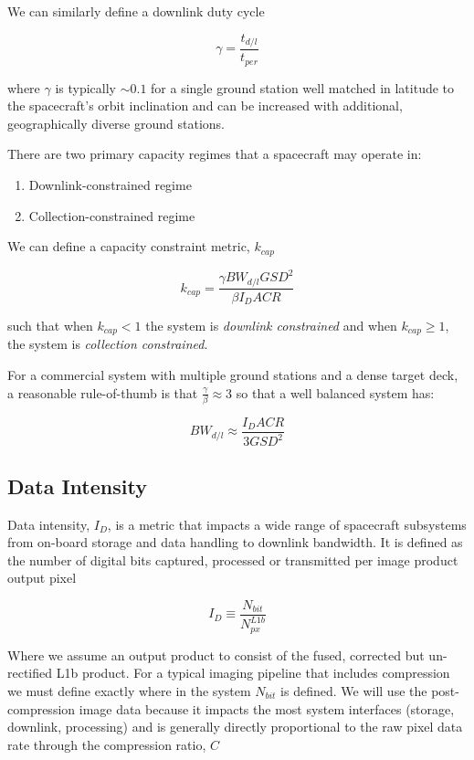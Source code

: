 \documentclass[10pt,journal]{IEEEtran}  %
\begin{document}
We can similarly define a downlink duty cycle

\begin{equation}
    \gamma = \frac{t_{d/l}}{t_{per}}
\end{equation}

where $\gamma$ is typically $\sim 0.1$ for a single ground station well matched in latitude to the spacecraft's orbit inclination and can be increased with additional, geographically diverse ground stations.

There are two primary capacity regimes that a spacecraft may operate in:

\begin{enumerate}
\item Downlink-constrained regime
\item Collection-constrained regime
\end{enumerate}

We can define a capacity constraint metric, $k_{cap}$

\begin{equation}
k_{cap} = \frac{\gamma BW_{d/l} GSD^2}{\beta I_D ACR}
\end{equation}

such that when $k_{cap} < 1$ the system is \emph{downlink constrained} and when $k_{cap} \geq 1$, the system is \emph{collection constrained}.

For a commercial system with multiple ground stations and a dense target deck, a reasonable rule-of-thumb is that $\frac{\gamma}{\beta} \approx 3$ so that a well balanced system has:

\begin{equation}
    BW_{d/l} \approx \frac{I_D ACR}{3 GSD^2}
\end{equation}

\subsection{Data Intensity}

Data intensity, $I_D$, is a metric that impacts a wide range of spacecraft subsystems from on-board storage and data handling to downlink bandwidth.  It is defined as the number of digital bits captured, processed or transmitted per image product output pixel

$$I_D \equiv \frac{N_{bit}}{N_{px}^{L1b}}$$

Where we assume an output product to consist of the fused, corrected but un-rectified L1b product. For a typical imaging pipeline that includes compression we must define exactly where in the system $N_{bit}$ is defined.  We will use the post-compression image data because it impacts the most system interfaces (storage, downlink, processing) and is generally directly proportional to the raw pixel data rate through the compression ratio, $C$
\end{document}
